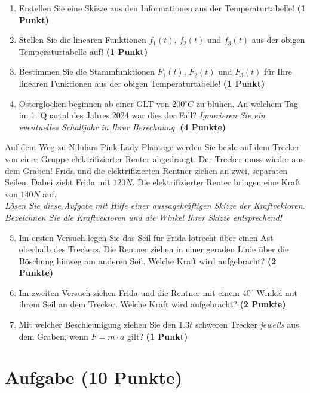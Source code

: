 \documentclass[a4paper, 9pt]{scrartcl}\usepackage[]{graphicx}\usepackage[]{xcolor}
\begin{document}
\begin{enumerate}
\item Erstellen Sie eine Skizze aus den Informationen aus der Temperaturtabelle!  \textbf{(1 Punkt)}
\item Stellen Sie die linearen Funktionen $f_1(t)$, $f_2(t)$ und $f_3(t)$ aus der obigen Temperaturtabelle auf!  \textbf{(1 Punkt)}
\item Bestimmen Sie die Stammfunktionen $F_1(t)$, $F_2(t)$ und $F_3(t)$ für Ihre linearen Funktionen aus der obigen Temperaturtabelle!  \textbf{(1 Punkt)}
\item Osterglocken beginnen ab einer GLT von 200$^\circ C$ zu blühen. An welchem Tag im 1. Quartal des Jahres 2024 war dies der Fall? \textit{Ignorieren Sie ein eventuelles Schaltjahr in Ihrer Berechnung.} \textbf{(4 Punkte)}
\end{enumerate}

Auf dem Weg zu Nilufars Pink Lady Plantage werden Sie beide auf dem Trecker von einer Gruppe elektrifizierter Renter abgedrängt. Der Trecker muss wieder aus dem Graben! Frida und die elektrifizierten Rentner ziehen an zwei, separaten Seilen. Dabei zieht Frida mit $120N$. Die elektrifizierter Renter  bringen eine Kraft von $140N$ auf.\\

\textit{Lösen Sie diese Aufgabe mit Hilfe einer aussagekräftigen Skizze der Kraftvektoren. Bezeichnen Sie die Kraftvektoren und die Winkel Ihrer Skizze entsprechend!}

\begin{enumerate}
  \setcounter{enumi}{4}  
\item Im ersten Versuch legen Sie das Seil für Frida lotrecht über einen Ast oberhalb des Treckers. Die Rentner ziehen in einer geraden Linie über die Böschung hinweg am anderen Seil. Welche Kraft wird aufgebracht?  \textbf{(2 Punkte)}
\item Im zweiten Versuch ziehen Frida und die Rentner mit einem $40^\circ$ Winkel mit ihrem Seil an dem Trecker. Welche Kraft wird aufgebracht? \textbf{(2 Punkte)}
\item Mit welcher Beschleunigung ziehen Sie den $1.3t$ schweren Trecker \textit{jeweils} aus dem Graben, wenn $F = m \cdot a$ gilt? \textbf{(1 Punkt)}
\end{enumerate}

 
\clearpage

\section{Aufgabe \hfill (10 Punkte)}
\end{document}
